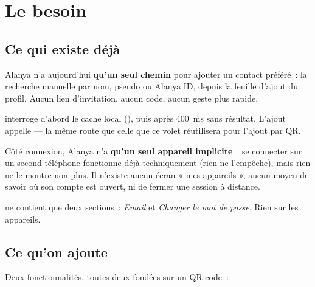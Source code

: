 
\chapter{Le besoin}

\section{Ce qui existe déjà}

Alanya n'a aujourd'hui \textbf{qu'un seul chemin} pour ajouter un contact préféré~: la
recherche manuelle par nom, pseudo ou Alanya ID, depuis la feuille d'ajout du profil.
Aucun lien d'invitation, aucun code, aucun geste plus rapide.

\begin{constat}
 interroge d'abord le cache local
(), puis  après 400~ms sans résultat.
L'ajout appelle  --- la même route que celle que ce volet
réutilisera pour l'ajout par QR.
\end{constat}

Côté connexion, Alanya n'a \textbf{qu'un seul appareil implicite}~: se connecter sur un
second téléphone fonctionne déjà techniquement (rien ne l'empêche), mais rien ne le montre
non plus. Il n'existe aucun écran « mes appareils », aucun moyen de savoir où son compte est
ouvert, ni de fermer une session à distance.

\begin{constat}
 ne contient que deux
sections~: \emph{Email} et \emph{Changer le mot de passe}. Rien sur les appareils.
\end{constat}

\section{Ce qu'on ajoute}

Deux fonctionnalités, toutes deux fondées sur un QR code~:

